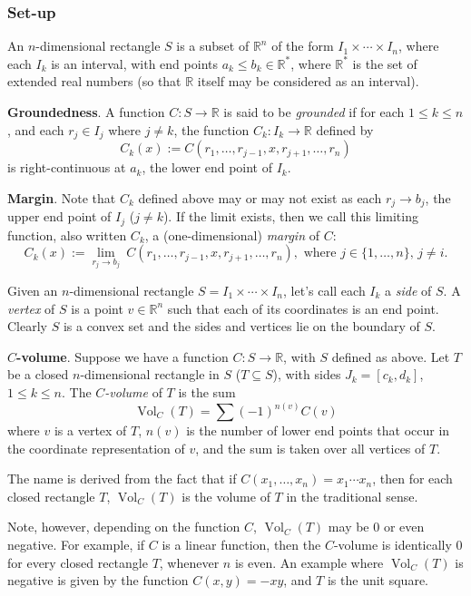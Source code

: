 \documentclass[12pt]{article}
\begin{document}
\subsubsection*{Set-up}

An $n$-dimensional rectangle $S$ is a subset of $\mathbb{R}^n$ of the form $I_1\times \cdots \times I_n$, where each $I_k$ is an interval, with end points $a_k\le b_k\in \mathbb{R}^*$, where $\mathbb{R}^*$ is the set of extended real numbers (so that $\mathbb{R}$ itself may be considered as an interval).

\textbf{Groundedness}. A function $C:S\to \mathbb{R}$ is said to be \emph{grounded} if for each $1\le k\le n$, and each $r_j\in I_j$ where $j\ne k$, the function $C_k:I_k\to \mathbb{R}$ defined by $$C_k(x):=C(r_1,\ldots,r_{j-1},x,r_{j+1},\ldots,r_n)$$ is right-continuous at $a_k$, the lower end point of $I_k$.

\textbf{Margin}.  Note that $C_k$ defined above may or may not exist as each $r_j\to b_j$, the upper end point of $I_j$ ($j\ne k$).  If the limit exists, then we call this limiting function, also written $C_k$, a (one-dimensional) \emph{margin} of $C$:
$$C_k(x):=\lim_{r_j\to b_j}\ C(r_1,\ldots,r_{j-1},x,r_{j+1},\ldots,r_n),\mbox{ where }j\in\lbrace 1,\ldots,n\rbrace\mbox{, }j\neq i.$$

Given an $n$-dimensional rectangle $S=I_1\times \cdots \times I_n$, let's call each $I_k$ a \emph{side} of $S$.  A \emph{vertex} of $S$ is a point $v\in\mathbb{R}^n$ such that each of its coordinates is an end point.  Clearly $S$ is a convex set and the sides and vertices lie on the boundary of $S$.

\textbf{$C$-volume}. Suppose we have a function $C:S\to \mathbb{R}$, with $S$ defined as above.  Let $T$ be a closed $n$-dimensional rectangle in $S$ ($T\subseteq S$), with sides $J_k=[c_k,d_k]$, $1\le k\le n$.  The \emph{$C$-volume} of $T$ is the sum
$$\operatorname{Vol}_C(T)=\sum (-1)^{n(v)}C(v)$$
where $v$ is a vertex of $T$, $n(v)$ is the number of lower end points that occur in the coordinate representation of $v$, and the sum is taken over all vertices of $T$.

The name  is derived from the fact that if $C(x_1,\ldots,x_n)=x_1\cdots x_n$, then for each closed rectangle $T$, $\operatorname{Vol}_C(T)$ is the volume of $T$ in the traditional sense.

Note, however, depending on the function $C$, $\operatorname{Vol}_C(T)$ may be $0$ or even negative.  For example, if $C$ is a linear function, then the $C$-volume is identically $0$ for every closed rectangle $T$, whenever $n$ is even.  An example where $\operatorname{Vol}_C(T)$ is negative is given by the function $C(x,y)=-xy$, and $T$ is the unit square.
\end{document}
